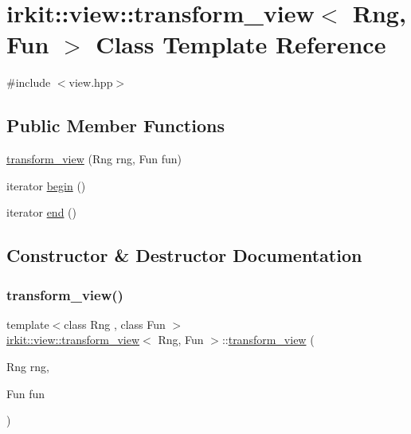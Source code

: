 \hypertarget{classirkit_1_1view_1_1transform__view}{}\section{irkit\+:\+:view\+:\+:transform\+\_\+view$<$ Rng, Fun $>$ Class Template Reference}
\label{classirkit_1_1view_1_1transform__view}


{\ttfamily \#include $<$view.\+hpp$>$}

\subsection*{Public Member Functions}
\begin{DoxyCompactItemize}
\item 
\mbox{\hyperlink{classirkit_1_1view_1_1transform__view_a62f789b7752828809d3a84db8dcc884b}{transform\+\_\+view}} (Rng rng, Fun fun)
\item 
iterator \mbox{\hyperlink{classirkit_1_1view_1_1transform__view_a6a4643fb239fa9ac74bbc9bfbfd806e9}{begin}} ()
\item 
iterator \mbox{\hyperlink{classirkit_1_1view_1_1transform__view_ad0b0e9db406e42257883d29adecce451}{end}} ()
\end{DoxyCompactItemize}


\subsection{Constructor \& Destructor Documentation}
\mbox{\label{classirkit_1_1view_1_1transform__view_a62f789b7752828809d3a84db8dcc884b}} 
\subsubsection{\texorpdfstring{transform\+\_\+view()}{transform\_view()}}
{\footnotesize\ttfamily template$<$class Rng , class Fun $>$ \\
\mbox{\hyperlink{classirkit_1_1view_1_1transform__view}{irkit\+::view\+::transform\+\_\+view}}$<$ Rng, Fun $>$\+::\mbox{\hyperlink{classirkit_1_1view_1_1transform__view}{transform\+\_\+view}} (\begin{DoxyParamCaption}\item[{Rng}]{rng,  }\item[{Fun}]{fun }\end{DoxyParamCaption})\hspace{0.3cm}{\ttfamily [inline]}}



